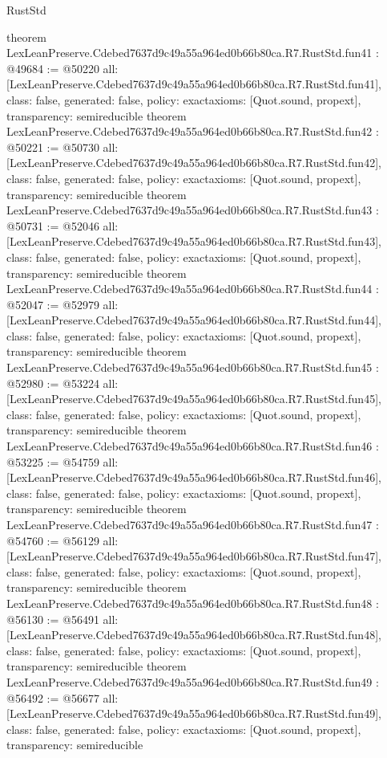 \begin{lexlean}{RustStd}
\begin{coremodule}
{}
theorem LexLeanPreserve.Cdebed7637d9c49a55a964ed0b66b80ca.R7.RustStd.fun41 : @49684 := @50220 {
  all: [LexLeanPreserve.Cdebed7637d9c49a55a964ed0b66b80ca.R7.RustStd.fun41],
  class: false,
  generated: false,
  policy: exact{axioms: [Quot.sound, propext]},
  transparency: semireducible
}
theorem LexLeanPreserve.Cdebed7637d9c49a55a964ed0b66b80ca.R7.RustStd.fun42 : @50221 := @50730 {
  all: [LexLeanPreserve.Cdebed7637d9c49a55a964ed0b66b80ca.R7.RustStd.fun42],
  class: false,
  generated: false,
  policy: exact{axioms: [Quot.sound, propext]},
  transparency: semireducible
}
theorem LexLeanPreserve.Cdebed7637d9c49a55a964ed0b66b80ca.R7.RustStd.fun43 : @50731 := @52046 {
  all: [LexLeanPreserve.Cdebed7637d9c49a55a964ed0b66b80ca.R7.RustStd.fun43],
  class: false,
  generated: false,
  policy: exact{axioms: [Quot.sound, propext]},
  transparency: semireducible
}
theorem LexLeanPreserve.Cdebed7637d9c49a55a964ed0b66b80ca.R7.RustStd.fun44 : @52047 := @52979 {
  all: [LexLeanPreserve.Cdebed7637d9c49a55a964ed0b66b80ca.R7.RustStd.fun44],
  class: false,
  generated: false,
  policy: exact{axioms: [Quot.sound, propext]},
  transparency: semireducible
}
theorem LexLeanPreserve.Cdebed7637d9c49a55a964ed0b66b80ca.R7.RustStd.fun45 : @52980 := @53224 {
  all: [LexLeanPreserve.Cdebed7637d9c49a55a964ed0b66b80ca.R7.RustStd.fun45],
  class: false,
  generated: false,
  policy: exact{axioms: [Quot.sound, propext]},
  transparency: semireducible
}
theorem LexLeanPreserve.Cdebed7637d9c49a55a964ed0b66b80ca.R7.RustStd.fun46 : @53225 := @54759 {
  all: [LexLeanPreserve.Cdebed7637d9c49a55a964ed0b66b80ca.R7.RustStd.fun46],
  class: false,
  generated: false,
  policy: exact{axioms: [Quot.sound, propext]},
  transparency: semireducible
}
theorem LexLeanPreserve.Cdebed7637d9c49a55a964ed0b66b80ca.R7.RustStd.fun47 : @54760 := @56129 {
  all: [LexLeanPreserve.Cdebed7637d9c49a55a964ed0b66b80ca.R7.RustStd.fun47],
  class: false,
  generated: false,
  policy: exact{axioms: [Quot.sound, propext]},
  transparency: semireducible
}
theorem LexLeanPreserve.Cdebed7637d9c49a55a964ed0b66b80ca.R7.RustStd.fun48 : @56130 := @56491 {
  all: [LexLeanPreserve.Cdebed7637d9c49a55a964ed0b66b80ca.R7.RustStd.fun48],
  class: false,
  generated: false,
  policy: exact{axioms: [Quot.sound, propext]},
  transparency: semireducible
}
theorem LexLeanPreserve.Cdebed7637d9c49a55a964ed0b66b80ca.R7.RustStd.fun49 : @56492 := @56677 {
  all: [LexLeanPreserve.Cdebed7637d9c49a55a964ed0b66b80ca.R7.RustStd.fun49],
  class: false,
  generated: false,
  policy: exact{axioms: [Quot.sound, propext]},
  transparency: semireducible
}
\end{coremodule}
\end{lexlean}
